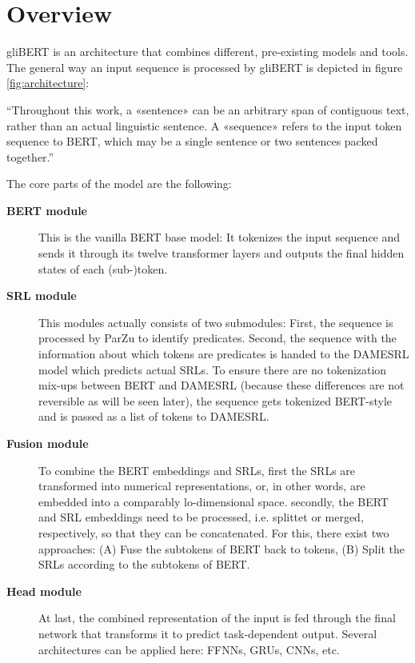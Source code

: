 
\label{chap:4_architecture}

\section{Overview}

gliBERT is an architecture that combines different, pre-existing models and tools.  The general
way an input sequence is processed by gliBERT is depicted in figure \ref{fig:architecture}:


``Throughout this work, a «sentence» can be an arbitrary span of contiguous text, rather
than an actual linguistic sentence. A «sequence» refers to the input token sequence to BERT,
which may be a single sentence or two sentences packed together.'' \citep{devlin2018bert}



The core parts of the model are the following:

\begin{description}
	\item[\textbf{BERT module}] This is the vanilla BERT base model: It tokenizes the input sequence and sends it through its twelve transformer layers and outputs the final hidden states of each (sub-)token.
  \item[\textbf{SRL module}] This modules actually consists of two submodules: First, the sequence is processed by ParZu to identify predicates.
	Second, the sequence with the information about which tokens are predicates is handed to the DAMESRL model which predicts actual SRLs.
	To ensure there are no tokenization mix-ups between BERT and DAMESRL (because these differences are not reversible as will be seen later), the sequence gets tokenized BERT-style and is passed as a list of tokens to DAMESRL.
  \item[\textbf{Fusion module}] To combine the BERT embeddings and SRLs, first the SRLs are transformed into numerical representations, or, in other words, are embedded into a comparably lo-dimensional space.
	secondly, the BERT and SRL embeddings need to be processed, i.e. splittet or merged, respectively, so that they can be concatenated.
	For this, there exist two approaches:
	(A) Fuse the subtokens of BERT back to tokens, (B) Split the SRLs according to the subtokens of BERT.
  \item[\textbf{Head module}] At last, the combined representation of the input is fed through the final network that transforms it to predict task-dependent output. Several architectures can be applied here: FFNNs, GRUs, CNNs, etc.
\end{description}

